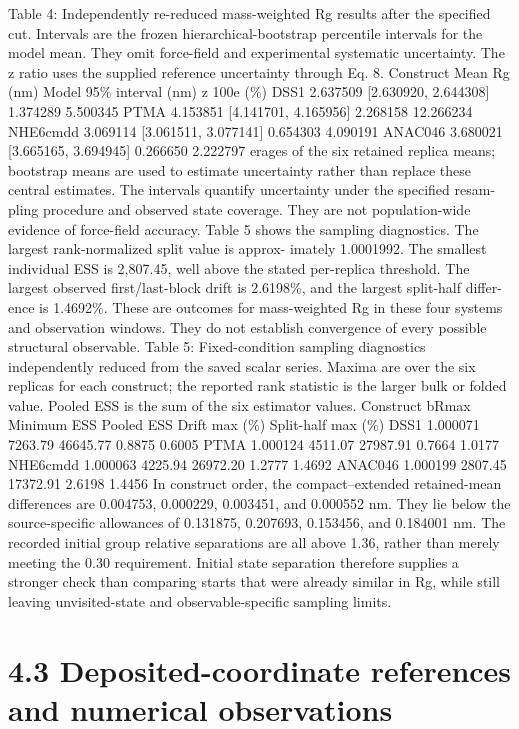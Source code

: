 \documentclass[11pt]{article}
\begin{document}
Table 4: Independently re-reduced mass-weighted Rg results after the specified cut. Intervals are
the frozen hierarchical-bootstrap percentile intervals for the model mean. They omit force-field and
experimental systematic uncertainty. The z ratio uses the supplied reference uncertainty through
Eq. 8.
Construct Mean Rg (nm) Model 95\% interval (nm) z 100e (\%)
DSS1 2.637509 [2.630920, 2.644308] 1.374289 5.500345
PTMA 4.153851 [4.141701, 4.165956] 2.268158 12.266234
NHE6cmdd 3.069114 [3.061511, 3.077141] 0.654303 4.090191
ANAC046 3.680021 [3.665165, 3.694945] 0.266650 2.222797
erages of the six retained replica means; bootstrap means are used to estimate uncertainty rather
than replace these central estimates. The intervals quantify uncertainty under the specified resam-
pling procedure and observed state coverage. They are not population-wide evidence of force-field
accuracy.
Table 5 shows the sampling diagnostics. The largest rank-normalized split value is approx-
imately 1.0001992. The smallest individual ESS is 2,807.45, well above the stated per-replica
threshold. The largest observed first/last-block drift is 2.6198\%, and the largest split-half differ-
ence is 1.4692\%. These are outcomes for mass-weighted Rg in these four systems and observation
windows. They do not establish convergence of every possible structural observable.
Table 5: Fixed-condition sampling diagnostics independently reduced from the saved scalar series.
Maxima are over the six replicas for each construct; the reported rank statistic is the larger bulk
or folded value. Pooled ESS is the sum of the six estimator values.
Construct bRmax Minimum ESS Pooled ESS Drift max (\%) Split-half max (\%)
DSS1 1.000071 7263.79 46645.77 0.8875 0.6005
PTMA 1.000124 4511.07 27987.91 0.7664 1.0177
NHE6cmdd 1.000063 4225.94 26972.20 1.2777 1.4692
ANAC046 1.000199 2807.45 17372.91 2.6198 1.4456
In construct order, the compact–extended retained-mean differences are 0.004753, 0.000229,
0.003451, and 0.000552 nm. They lie below the source-specific allowances of 0.131875, 0.207693,
0.153456, and 0.184001 nm. The recorded initial group relative separations are all above 1.36, rather
than merely meeting the 0.30 requirement. Initial state separation therefore supplies a stronger
check than comparing starts that were already similar in Rg, while still leaving unvisited-state and
observable-specific sampling limits.

\section*{4.3 Deposited-coordinate references and numerical observations}
\end{document}
